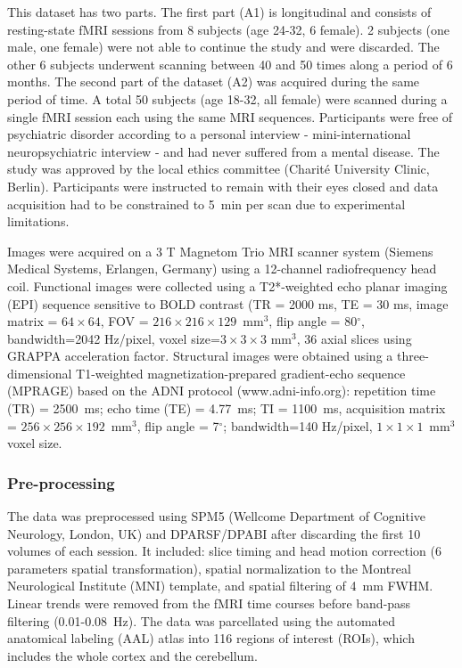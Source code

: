 \documentclass{article}
\begin{document}
This dataset has two parts. The first part (A1) is longitudinal and consists of resting-state fMRI sessions from 8 subjects (age 24-32, 6 female). 2 subjects (one male, one female) were not able to continue the study and were discarded. The other 6 subjects underwent scanning between 40 and 50 times along a period of 6 months. The second part of the dataset (A2) was acquired during the same period of time. A total 50 subjects (age 18-32, all female) were scanned during a single fMRI session each using the same MRI sequences. Participants were free of psychiatric disorder according to a personal interview - mini-international neuropsychiatric interview \cite{Sheehan_JCP_1998} - and had never suffered from a mental disease. The study was approved by the local ethics committee (Charit{\'e} University Clinic, Berlin). 
Participants were instructed to remain with their eyes closed and data acquisition had to be constrained to 5~min per scan due to experimental limitations. 

Images were acquired on a 3 T Magnetom Trio MRI scanner system (Siemens Medical Systems, Erlangen, Germany) using a 12-channel radiofrequency head coil. Functional images were collected using a T2*-weighted echo planar imaging (EPI) sequence sensitive to BOLD contrast (TR = 2000 ms, TE = 30 ms, image matrix = $64 \times 64$, FOV = $216\times216\times129$~mm$^3$, flip angle = 80$^\circ$, bandwidth=2042 Hz/pixel, voxel size=$3 \times 3 \times 3$ mm$^3$, 36 axial slices using GRAPPA acceleration factor.
Structural images were obtained using a three-dimensional T1-weighted magnetization-prepared gradient-echo sequence (MPRAGE) based on the ADNI protocol (www.adni-info.org): repetition time (TR) = 2500~ms; echo time (TE) = 4.77~ms; TI = 1100~ms, acquisition matrix = $256 \times256\times192$~mm$^3$, flip angle = 7$^\circ$; bandwidth=140 Hz/pixel, $1\times1\times1$~mm$^3$ voxel size. 

\subsubsection{Pre-processing}

The data was preprocessed using SPM5 (Wellcome Department of Cognitive Neurology, London, UK) and DPARSF/DPABI \cite{Yan_Neuroinf_2016} after discarding the first 10 volumes of each session. It included: slice timing and head motion correction (6 parameters spatial transformation), spatial normalization to the Montreal Neurological Institute (MNI) template, and spatial filtering of 4~mm FWHM.
Linear trends were removed from the fMRI time courses before band-pass filtering (0.01-0.08~Hz).
The data was parcellated using the automated anatomical labeling (AAL) atlas \cite{Tzourio2002} into 116 regions of interest (ROIs), which includes the whole cortex and the cerebellum.
\end{document}
